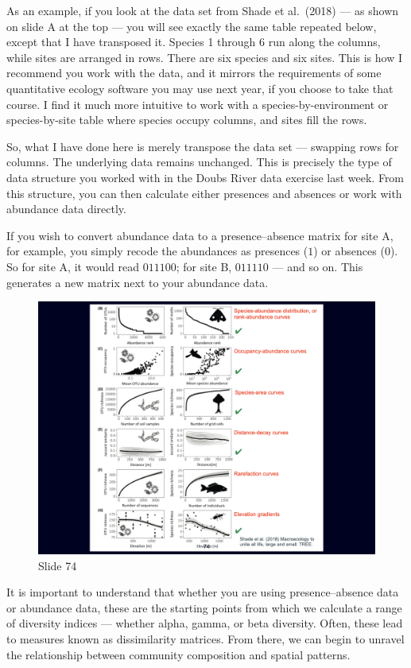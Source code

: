 \documentclass[
  10pt,
]{book}
\begin{document}
As an example, if you look at the data set from Shade et al.~(2018) ---
as shown on slide A at the top --- you will see exactly the same table
repeated below, except that I have transposed it. Species 1 through 6
run along the columns, while sites are arranged in rows. There are six
species and six sites. This is how I recommend you work with the data,
and it mirrors the requirements of some quantitative ecology software
you may use next year, if you choose to take that course. I find it much
more intuitive to work with a species-by-environment or species-by-site
table where species occupy columns, and sites fill the rows.

So, what I have done here is merely transpose the data set --- swapping
rows for columns. The underlying data remains unchanged. This is
precisely the type of data structure you worked with in the Doubs River
data exercise last week. From this structure, you can then calculate
either presences and absences or work with abundance data directly.

If you wish to convert abundance data to a presence--absence matrix for
site A, for example, you simply recode the abundances as presences
(\(1\)) or absences (\(0\)). So for site A, it would read \(011100\);
for site B, \(011110\) --- and so on. This generates a new matrix next
to your abundance data.

\begin{figure}[ht]
\centering
\includegraphics[width=0.8\linewidth]{../images/BDC334/BDC334-074.jpeg}
\caption*{Slide 74}
\end{figure}

It is important to understand that whether you are using
presence--absence data or abundance data, these are the starting points
from which we calculate a range of diversity indices --- whether alpha,
gamma, or beta diversity. Often, these lead to measures known as
dissimilarity matrices. From there, we can begin to unravel the
relationship between community composition and spatial patterns.
\end{document}
